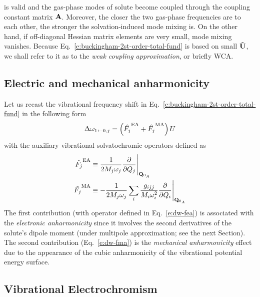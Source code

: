 \documentclass[a4paper,titlepage,twoside,fleqn,12pt]{book}
\begin{document}
\begin{refsection}
is valid and the gas\hyp{}phase modes of solute become coupled
through the coupling constant matrix $\bf A$. Moreover, the closer
the two gas\hyp{}phase frequencies are to each other, the stronger the solvation\hyp{}induced
mode mixing is. On the other hand, if off\hyp{}diagonal Hessian matrix elements are
very small, mode mixing vanishes. Because Eq.~\eqref{e:buckingham-2st-order-total-fund}
is based on small $\tilde{\bf U}$, we shall refer to it
as to the \emph{weak coupling approximation}, or briefly WCA.

\subsection{Electric and mechanical anharmonicity}

Let us recast the vibrational frequency shift in Eq.~\eqref{e:buckingham-2st-order-total-fund}
in the following form
%
\begin{equation} 
 \Delta\omega_{1\leftarrow 0,j} = \left( \hat{F_j}^{\rm EA} + \hat{F_j}^{\rm MA}\right) U
\end{equation}
%
with the auxiliary vibrational solvatochromic operators defined as
%
\begin{subequations} \label{e:dw-fea-fma}
 \begin{align}
  \hat{F_j}^{\rm EA} &\equiv  \frac{1}{2M_j\omega_j} \frac{\partial}{\partial Q_j} \Bigg|_{{\bf Q}_{0_A}} 
         \label{e:dw-fea}\\
  \hat{F_j}^{\rm MA} &\equiv -\frac{1}{2M_j\omega_j} 
             \sum_i \frac{g_{ijj}}{M_i\omega_i^2} \frac{\partial}{\partial Q_i} \Bigg|_{{\bf Q}_{0_A}} 
         \label{e:dw-fma}
 \end{align}
\end{subequations}
%
The first contribution (with operator defined in Eq.~\eqref{e:dw-fea}) 
is associated with the \emph{electronic anharmonicity}
since it involves the second derivatives of the solute's dipole
moment (under multipole approximation; see the next Section). 
The second contribution (Eq.~\eqref{e:dw-fma})
is the \emph{mechanical anharmonicity} effect due to the appearance of the 
cubic anharmonicity of the vibrational potential energy surface.

\subsection{Vibrational Electrochromism}


\end{refsection}
\end{document}
